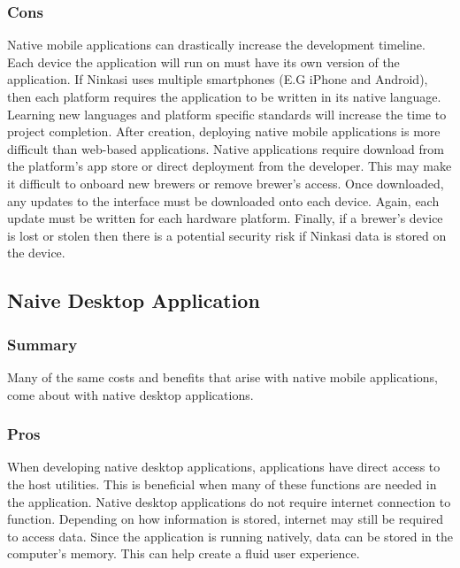 \documentclass[draftclsnofoot,onecolumn,letterpaper,10pt,compsoc]{IEEEtran}
\begin{document}
        \subsubsection{Cons}
            Native mobile applications can drastically increase the development timeline.
            Each device the application will run on must have its own version of the application.
            If Ninkasi uses multiple smartphones (E.G iPhone and Android), then each platform requires the application to be written in its native language.
            Learning new languages and platform specific standards will increase the time to project completion.
            After creation, deploying native mobile applications is more difficult than web-based applications.
            Native applications require download from the platform's app store or direct deployment from the developer.
            This may make it difficult to onboard new brewers or remove brewer's access.
            Once downloaded, any updates to the interface must be downloaded onto each device.
            Again, each update must be written for each hardware platform.
            Finally, if a brewer's device is lost or stolen then there is a potential security risk if Ninkasi data is stored on the device.
    
    
	\subsection{Naive Desktop Application}
        \subsubsection{Summary}
            Many of the same costs and benefits that arise with native mobile applications, come about with native desktop applications.
        
        \subsubsection{Pros}
            When developing native desktop applications, applications have direct access to the host utilities. 
            This is beneficial when many of these functions are needed in the application.
            Native desktop applications do not require internet connection to function.
            Depending on how information is stored, internet may still be required to access data.
            Since the application is running natively, data can be stored in the computer's memory.
            This can help create a fluid user experience.
    
\end{document}
